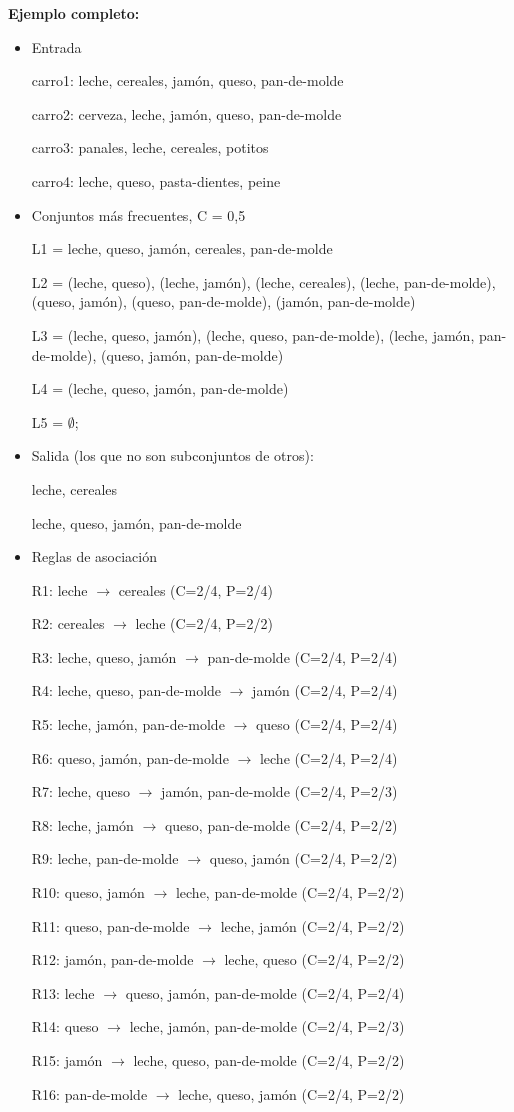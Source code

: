 \documentclass[12pt, twoside, openright]{report} %
\begin{document}
\textbf{Ejemplo completo:}
\begin{itemize}
	\item Entrada

	carro1: leche, cereales, jamón, queso, pan-de-molde

	carro2: cerveza, leche, jamón, queso, pan-de-molde

	carro3: panales, leche, cereales, potitos

	carro4: leche, queso, pasta-dientes, peine
	\item Conjuntos más frecuentes, C = 0,5

	L1 = {leche, queso, jamón, cereales, pan-de-molde}

	L2 = {(leche, queso), (leche, jamón), (leche, cereales), (leche, pan-de-molde), 
	(queso, jamón), (queso, pan-de-molde), (jamón, pan-de-molde)  }

	L3 = {(leche, queso, jamón), (leche, queso, pan-de-molde),
	(leche, jamón, pan-de-molde), (queso, jamón, pan-de-molde)}

	L4 = {(leche, queso, jamón, pan-de-molde)}

	L5 = $\emptyset$;
	\item Salida (los que no son subconjuntos de otros):

	leche, cereales

	leche, queso, jamón, pan-de-molde
	\item Reglas de asociación


	R1: leche $\rightarrow$ cereales (C=2/4, P=2/4)

	R2: cereales $\rightarrow$ leche (C=2/4, P=2/2)

	R3: leche, queso, jamón  $\rightarrow$ pan-de-molde (C=2/4, P=2/4)

	R4: leche, queso, pan-de-molde $\rightarrow$ jamón (C=2/4, P=2/4) 

	R5: leche, jamón, pan-de-molde  $\rightarrow$ queso (C=2/4, P=2/4)

	R6: queso, jamón, pan-de-molde  $\rightarrow$ leche (C=2/4, P=2/4)

	R7: leche, queso $\rightarrow$ jamón, pan-de-molde (C=2/4, P=2/3) 

	R8: leche, jamón  $\rightarrow$ queso, pan-de-molde (C=2/4, P=2/2)

	R9: leche, pan-de-molde $\rightarrow$ queso, jamón (C=2/4, P=2/2) 

	R10: queso, jamón  $\rightarrow$ leche, pan-de-molde (C=2/4, P=2/2)

	R11: queso, pan-de-molde $\rightarrow$ leche, jamón (C=2/4, P=2/2) 

	R12: jamón, pan-de-molde  $\rightarrow$ leche, queso (C=2/4, P=2/2)

	R13: leche $\rightarrow$ queso, jamón, pan-de-molde (C=2/4, P=2/4) 

	R14: queso $\rightarrow$ leche, jamón, pan-de-molde (C=2/4, P=2/3) 

	R15: jamón  $\rightarrow$ leche, queso, pan-de-molde (C=2/4, P=2/2)

	R16: pan-de-molde $\rightarrow$ leche, queso, jamón (C=2/4, P=2/2)
\end{itemize}
\end{document}
